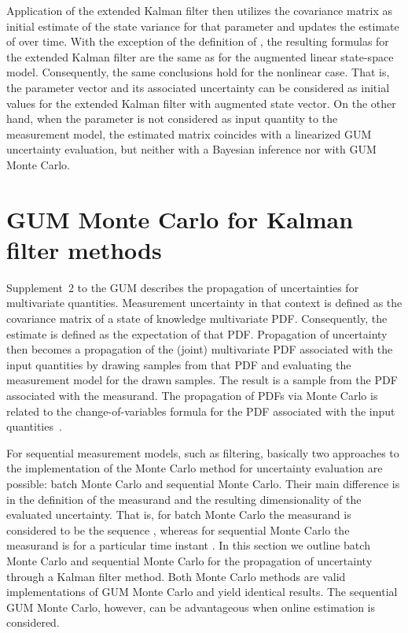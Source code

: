 \documentclass[10pt]{article}
\begin{document}
\begin{spacing}{1}
Application of the extended Kalman filter then utilizes the covariance matrix  as initial estimate of the state variance for that parameter and updates the estimate of  over time.  
With the exception of the definition of , the resulting formulas for the extended Kalman filter are the same as for the augmented linear state-space model. Consequently, the same conclusions hold for the nonlinear case. That is, the parameter vector  and its associated uncertainty  can be considered as initial values for the extended Kalman filter with augmented state vector. On the other hand, when the parameter  is not considered as input quantity to the measurement model, the estimated matrix  coincides with a linearized GUM uncertainty evaluation, but neither with a Bayesian inference nor with GUM Monte Carlo.

\section{GUM Monte Carlo for Kalman filter methods}
\label{sec:MC}
Supplement~2 to the GUM \cite{GUMS2} describes the propagation of uncertainties for multivariate quantities. Measurement uncertainty in that context is defined as the covariance matrix of a state of knowledge multivariate PDF. Consequently, the estimate is defined as the expectation of that PDF. Propagation of uncertainty then becomes a propagation of the (joint) multivariate PDF associated with the input quantities  by drawing samples from that PDF and evaluating the measurement model for the drawn samples. The result is a sample from the PDF associated with the measurand. The propagation of PDFs via Monte Carlo is related to the change-of-variables formula for the PDF associated with the input quantities~\cite{possolo2007assessment}. 

For sequential measurement models, such as filtering, basically two approaches to the implementation of the Monte Carlo method for uncertainty evaluation are possible: batch Monte Carlo and sequential Monte Carlo. Their main difference is in the definition of the measurand and the resulting dimensionality of the evaluated uncertainty. That is, for batch Monte Carlo the measurand is considered to be the sequence , whereas for sequential Monte Carlo the measurand is  for a particular time instant . In this section we outline batch Monte Carlo and sequential Monte Carlo for the propagation of uncertainty through a Kalman filter method. Both Monte Carlo methods are valid implementations of GUM Monte Carlo and yield identical results. The sequential GUM Monte Carlo, however, can be advantageous when online estimation is considered.



\end{spacing}
\end{document}
